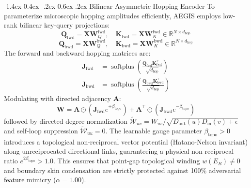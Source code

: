 \documentclass[10pt,twocolumn,letterpaper]{article}
\makeatletter
\renewcommand\subsection{\@startsection{subsection}{2}{\z@}%
                                     {-1.4ex\@plus -0.4ex \@minus -.2ex}%
                                     {0.6ex \@plus .2ex}%
                                     {\normalfont\normalsize\bfseries}}
\makeatother
\begin{document}
\subsection{Bilinear Asymmetric Hopping Encoder}
To parameterize microscopic hopping amplitudes efficiently, AEGIS employs low-rank bilinear key-query projections:
\begin{equation}
\mathbf{Q}_{\text{fwd}} = \mathbf{X} \mathbf{W}_Q^{\text{fwd}}, \quad \mathbf{K}_{\text{fwd}} = \mathbf{X} \mathbf{W}_K^{\text{fwd}} \in \mathbb{R}^{N \times d_{\text{hop}}}
\end{equation}
\begin{equation}
\mathbf{Q}_{\text{bwd}} = \mathbf{X} \mathbf{W}_Q^{\text{bwd}}, \quad \mathbf{K}_{\text{bwd}} = \mathbf{X} \mathbf{W}_K^{\text{bwd}} \in \mathbb{R}^{N \times d_{\text{hop}}}
\end{equation}
The forward and backward hopping matrices are:
\begin{align}
\mathbf{J}_{\text{fwd}} &= \operatorname{softplus}\left(\frac{\mathbf{Q}_{\text{fwd}} \mathbf{K}_{\text{fwd}}^\top}{\sqrt{d_{\text{hop}}}}\right) \\
\mathbf{J}_{\text{bwd}} &= \operatorname{softplus}\left(\frac{\mathbf{Q}_{\text{bwd}} \mathbf{K}_{\text{bwd}}^\top}{\sqrt{d_{\text{hop}}}}\right)
\end{align}
Modulating with directed adjacency $\mathbf{A}$:
\begin{equation}
\mathbf{W} = \mathbf{A} \odot \left(\mathbf{J}_{\text{fwd}} e^{+\beta_{\text{topo}}}\right) + \mathbf{A}^\top \odot \left(\mathbf{J}_{\text{bwd}} e^{-\beta_{\text{topo}}}\right)
\end{equation}
followed by directed degree normalization $\tilde{\mathcal{W}}_{uv} = W_{uv} / \sqrt{D_{\text{out}}(u) D_{\text{in}}(v) + \epsilon}$ and self-loop suppression $\tilde{\mathcal{W}}_{uu} = 0$. The learnable gauge parameter $\beta_{\text{topo}} > 0$ introduces a topological non-reciprocal vector potential (Hatano-Nelson invariant) along unreciprocated directional links, guaranteeing a physical non-reciprocal ratio $e^{2\beta_{\text{topo}}} > 1.0$. This ensures that point-gap topological winding $w(E_B) \ne 0$ and boundary skin condensation are strictly protected against 100\% adversarial feature mimicry ($\alpha = 1.00$).
\end{document}
